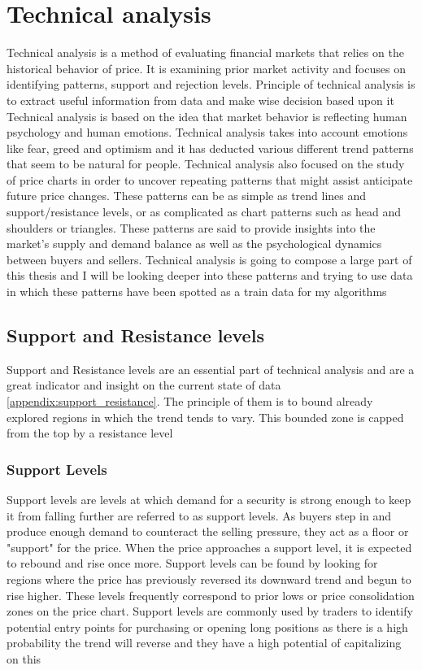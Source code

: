 \documentclass{imc-inf}
\begin{document}
	\section{Technical analysis}
	Technical analysis \cite{tech_analysis} is a method of evaluating financial markets that relies on the historical behavior of price.
	It is examining prior market activity and focuses on identifying patterns, support and rejection levels.
	Principle of technical analysis is to extract useful information from data and make wise decision based upon it
	Technical analysis is based on the idea that market behavior is reflecting human psychology and human emotions.
	Technical analysis takes into account emotions like fear, greed and optimism and it has deducted various different trend patterns that seem to be natural for people.
	Technical analysis also focused on the study of price charts in order to uncover repeating patterns that might assist anticipate future price changes.
	These patterns can be as simple as trend lines and support/resistance levels, or as complicated as chart patterns such as head and shoulders or triangles.
	These patterns are said to provide insights into the market's supply and demand balance as well as the psychological dynamics between buyers and sellers.
	Technical analysis is going to compose a large part of this thesis and I will be looking deeper into these patterns and trying to use data
	in which these patterns have been spotted as a train data for my algorithms
	\subsection{Support and Resistance levels}
	Support and Resistance levels are an essential part of technical analysis and are a great indicator and insight on the current state of data \ref{appendix:support_resistance}.
	The principle of them is to bound already explored regions in which the trend tends to vary. This bounded zone is capped from the top by a resistance level
	\subsubsection{Support Levels}
	Support levels are levels at which demand for a security is strong enough to keep it from falling further are referred to as support levels.
	As buyers step in and produce enough demand to counteract the selling pressure, they act as a floor or "support" for the price.
	When the price approaches a support level, it is expected to rebound and rise once more.
	Support levels can be found by looking for regions where the price has previously reversed its downward trend and begun to rise higher.
	These levels frequently correspond to prior lows or price consolidation zones on the price chart. 
	Support levels are commonly used by traders to identify potential entry points for purchasing or opening long positions
	as there is a high probability the trend will reverse and they have a high potential of capitalizing on this
\end{document}
